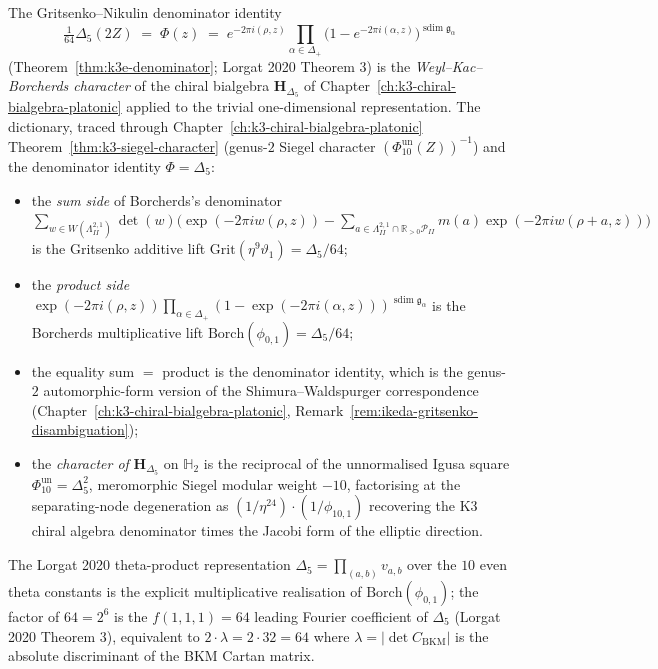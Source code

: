 \begin{remark}
\label{rem:k3e-gritsenko-nikulin-denominator-WKB-character}
The Gritsenko--Nikulin denominator identity
\[
 \tfrac{1}{64}\Delta_5(2Z)
 \;=\;
 \Phi(z)
 \;=\;
 e^{-2\pi i(\rho, z)}\prod_{\alpha\in\Delta_+}\bigl(1 - e^{-2\pi i(\alpha, z)}\bigr)^{\operatorname{sdim}\mathfrak g_\alpha}
\]
(Theorem~\ref{thm:k3e-denominator}; Lorgat 2020 Theorem $3$) is the
\emph{Weyl--Kac--Borcherds character} of the chiral bialgebra $\mathbf{H}_{\Delta_5}$ of
Chapter~\ref{ch:k3-chiral-bialgebra-platonic} applied to the trivial one-dimensional
representation. The dictionary, traced through Chapter~\ref{ch:k3-chiral-bialgebra-platonic}
Theorem~\ref{thm:k3-siegel-character} (genus-$2$ Siegel character
\((\Phi_{10}^{\mathrm{un}}(Z))^{-1}\)) and the denominator identity
\(\Phi=\Delta_5\):
\begin{itemize}
\item the \emph{sum side} of Borcherds's denominator
 $\sum_{w\in W(\Lambda^{2,1}_{II})}\det(w)\bigl(\exp(-2\pi i w(\rho, z))
 - \sum_{a\in\Lambda^{2,1}_{II}\cap\mathbb{R}_{>0}\mathcal{P}_{II}}m(a)\exp(-2\pi i w(\rho+a, z))\bigr)$
 is the Gritsenko additive lift
 $\mathrm{Grit}(\eta^9\vartheta_1) = \Delta_5/64$;
\item the \emph{product side}
 $\exp(-2\pi i(\rho, z))\prod_{\alpha\in\Delta_+}(1-\exp(-2\pi i(\alpha, z)))^{\operatorname{sdim}\mathfrak g_\alpha}$
 is the Borcherds multiplicative lift
 $\mathrm{Borch}(\phi_{0,1}) = \Delta_5/64$;
\item the equality sum $=$ product is the denominator identity, which is the
 genus-$2$ automorphic-form version of the Shimura--Waldspurger correspondence
 (Chapter~\ref{ch:k3-chiral-bialgebra-platonic},
 Remark~\ref{rem:ikeda-gritsenko-disambiguation});
\item the \emph{character of} $\mathbf{H}_{\Delta_5}$ on $\mathbb{H}_2$ is the
 reciprocal of the unnormalised Igusa square
 \(\Phi_{10}^{\mathrm{un}}=\Delta_5^2\), meromorphic Siegel modular weight $-10$,
 factorising at the separating-node degeneration as
 $(1/\eta^{24})\cdot(1/\phi_{10,1})$ recovering the K3 chiral algebra denominator
 times the Jacobi form of the elliptic direction.
\end{itemize}
The Lorgat 2020 theta-product representation $\Delta_5 = \prod_{(a,b)} v_{a,b}$ over
the $10$ even theta constants is the explicit multiplicative realisation of
$\mathrm{Borch}(\phi_{0,1})$; the factor of $64 = 2^6$ is the
$f(1,1,1) = 64$ leading Fourier coefficient of $\Delta_5$ (Lorgat 2020 Theorem $3$),
equivalent to $2\cdot\lambda = 2\cdot 32 = 64$ where $\lambda = |\det C_{\mathrm{BKM}}|$
is the absolute discriminant of the BKM Cartan matrix.
\end{remark}

